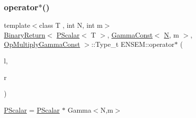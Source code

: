 \subsubsection{\texorpdfstring{operator$\ast$()}{operator*()}\hspace{0.1cm}{\footnotesize\ttfamily [3/5]}}
{\footnotesize\ttfamily template$<$class T , int N, int m$>$ \\
\mbox{\hyperlink{structENSEM_1_1BinaryReturn}{Binary\+Return}}$<$ \mbox{\hyperlink{classENSEM_1_1PScalar}{P\+Scalar}}$<$ T $>$, \mbox{\hyperlink{classENSEM_1_1GammaConst}{Gamma\+Const}}$<$ \mbox{\hyperlink{adat__devel_2lib_2hadron_2operator__name__util_8cc_a7722c8ecbb62d99aee7ce68b1752f337}{N}}, m $>$, \mbox{\hyperlink{structENSEM_1_1OpMultiplyGammaConst}{Op\+Multiply\+Gamma\+Const}} $>$\+::Type\+\_\+t E\+N\+S\+E\+M\+::operator$\ast$ (\begin{DoxyParamCaption}\item[{const \mbox{\hyperlink{classENSEM_1_1PScalar}{P\+Scalar}}$<$ T $>$ \&}]{l,  }\item[{const \mbox{\hyperlink{classENSEM_1_1GammaConst}{Gamma\+Const}}$<$ \mbox{\hyperlink{adat__devel_2lib_2hadron_2operator__name__util_8cc_a7722c8ecbb62d99aee7ce68b1752f337}{N}}, m $>$ \&}]{r }\end{DoxyParamCaption})\hspace{0.3cm}{\ttfamily [inline]}}



\mbox{\hyperlink{classENSEM_1_1PScalar}{P\+Scalar}} = \mbox{\hyperlink{classENSEM_1_1PScalar}{P\+Scalar}} $\ast$ Gamma$<$\+N,m$>$ 

\mbox{\label{group__primscalar_gab3054a5c0ba0653b3b4069e2449e20ab}} 
